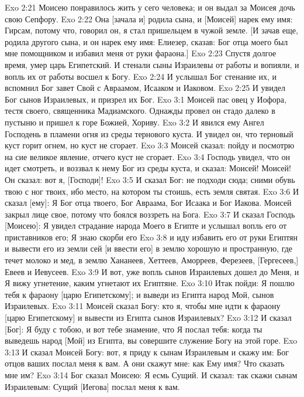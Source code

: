 \vs Exo 2:21 Моисею понравилось жить у сего человека; и он выдал за Моисея дочь свою Сепфору.
\vs Exo 2:22 Она [зачала и] родила сына, и [Моисей] нарек ему имя: Гирсам, потому что, говорил он, я стал пришельцем в чужой земле. [И зачав еще, родила другого сына, и он нарек ему имя: Елиезер, сказав: Бог отца моего был мне помощником и избавил меня от руки фараона.]
\rsbpar\vs Exo 2:23 Спустя долгое время, умер царь Египетский. И стенали сыны Израилевы от работы и вопияли, и вопль их от работы восшел к Богу.
\vs Exo 2:24 И услышал Бог стенание их, и вспомнил Бог завет Свой с Авраамом, Исааком и Иаковом.
\vs Exo 2:25 И увидел Бог сынов Израилевых, и призрел их Бог.
\vs Exo 3:1 Моисей пас овец у Иофора, тестя своего, священника Мадиамского. Однажды провел он стадо далеко в пустыню и пришел к горе Божией, Хориву.
\vs Exo 3:2 И явился ему Ангел Господень в пламени огня из среды тернового куста. И увидел он, что терновый куст горит огнем, но куст не сгорает.
\vs Exo 3:3 Моисей сказал: пойду и посмотрю на сие великое явление, отчего куст не сгорает.
\vs Exo 3:4 Господь увидел, что он идет смотреть, и воззвал к нему Бог из среды куста, и сказал: Моисей! Моисей! Он сказал: вот я, [Господи]!
\vs Exo 3:5 И сказал Бог: не подходи сюда; сними обувь твою с ног твоих, ибо место, на котором ты стоишь, есть земля святая.
\vs Exo 3:6 И сказал [ему]: Я Бог отца твоего, Бог Авраама, Бог Исаака и Бог Иакова. Моисей закрыл лице свое, потому что боялся воззреть на Бога.
\vs Exo 3:7 И сказал Господь [Моисею]: Я увидел страдание народа Моего в Египте и услышал вопль его от приставников его; Я знаю скорби его
\vs Exo 3:8 и иду избавить его от руки Египтян и вывести его из земли сей [и ввести его] в землю хорошую и пространную, где течет молоко и мед, в землю Хананеев, Хеттеев, Аморреев, Ферезеев, [Гергесеев,] Евеев и Иевусеев.
\vs Exo 3:9 И вот, уже вопль сынов Израилевых дошел до Меня, и Я вижу угнетение, каким угнетают их Египтяне.
\vs Exo 3:10 Итак пойди: Я пошлю тебя к фараону [царю Египетскому]; и выведи из Египта народ Мой, сынов Израилевых.
\vs Exo 3:11 Моисей сказал Богу: кто я, чтобы мне идти к фараону [царю Египетскому] и вывести из Египта сынов Израилевых?
\vs Exo 3:12 И сказал [Бог]: Я буду с тобою, и вот тебе знамение, что Я послал тебя: когда ты выведешь народ [Мой] из Египта, вы совершите служение Богу на этой горе.
\vs Exo 3:13 И сказал Моисей Богу: вот, я приду к сынам Израилевым и скажу им: Бог отцов ваших послал меня к вам. А они скажут мне: как Ему имя? Что сказать мне им?
\vs Exo 3:14 Бог сказал Моисею: Я есмь Сущий. И сказал: так скажи сынам Израилевым: Сущий [Иегова] послал меня к вам.
